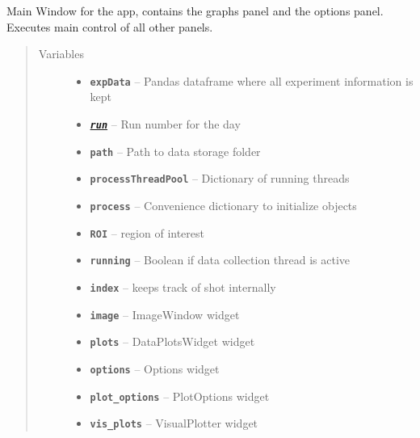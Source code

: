 \documentclass[letterpaper,10pt,english]{sphinxmanual}
\begin{document}
\begin{fulllineitems}
\label{MainWindow:SpinorMonitor.MainWindow}
Main Window for the app, contains the graphs panel and the options
panel.  Executes main control of all other panels.
\begin{quote}\begin{description}
\item[{Variables}] \leavevmode\begin{itemize}
\item {} 
\textbf{\texttt{expData}} -- Pandas dataframe where all experiment information is kept

\item {} 
{\hyperref[IncomingImage:Image.IncomingImage.run]{\emph{\textbf{\texttt{run}}}}} -- Run number for the day

\item {} 
\textbf{\texttt{path}} -- Path to data storage folder

\item {} 
\textbf{\texttt{processThreadPool}} -- Dictionary of running threads

\item {} 
\textbf{\texttt{process}} -- Convenience dictionary to initialize objects

\item {} 
\textbf{\texttt{ROI}} -- region of interest

\item {} 
\textbf{\texttt{running}} -- Boolean if data collection thread is active

\item {} 
\textbf{\texttt{index}} -- keeps track of shot internally

\item {} 
\textbf{\texttt{image}} -- ImageWindow widget

\item {} 
\textbf{\texttt{plots}} -- DataPlotsWidget widget

\item {} 
\textbf{\texttt{options}} -- Options widget

\item {} 
\textbf{\texttt{plot\_options}} -- PlotOptions widget

\item {} 
\textbf{\texttt{vis\_plots}} -- VisualPlotter widget


\end{itemize}
\end{description}
\end{quote}
\end{fulllineitems}
\end{document}
